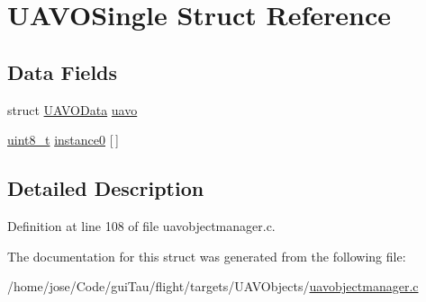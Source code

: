 \hypertarget{struct_u_a_v_o_single}{\section{U\-A\-V\-O\-Single Struct Reference}
\label{struct_u_a_v_o_single}
}
\subsection*{Data Fields}
\begin{DoxyCompactItemize}
\item 
struct \hyperlink{struct_u_a_v_o_data}{U\-A\-V\-O\-Data} \hyperlink{group___u_a_v_gadc5ae49c5f1cc194e3df35a0652d9a13}{uavo}
\item 
\hyperlink{stdint_8h_aba7bc1797add20fe3efdf37ced1182c5}{uint8\-\_\-t} \hyperlink{group___u_a_v_ga411e3c7c88a81c2f1cd74cab9a3ab5ec}{instance0} \mbox{[}$\,$\mbox{]}
\end{DoxyCompactItemize}


\subsection{Detailed Description}


Definition at line 108 of file uavobjectmanager.\-c.



The documentation for this struct was generated from the following file\-:\begin{DoxyCompactItemize}
\item 
/home/jose/\-Code/gui\-Tau/flight/targets/\-U\-A\-V\-Objects/\hyperlink{uavobjectmanager_8c}{uavobjectmanager.\-c}\end{DoxyCompactItemize}
